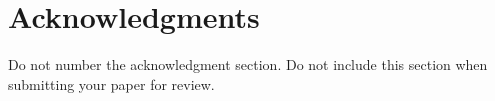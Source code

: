 \documentclass[11pt]{article}
\begin{document}
\begin{comment}
{\bf Citations}: Citations within the text appear
in parentheses as~\cite{Gusfield:97} or, if the author's name appears in
the text itself, as Gusfield~\shortcite{Gusfield:97}. 
Append lowercase letters to the year in cases of ambiguity.  
Treat double authors as in~\cite{Aho:72}, but write as in~\cite{Chandra:81} when more than two authors are involved. Collapse multiple citations as in~\cite{Gusfield:97,Aho:72}. Also refrain from using full citations as sentence constituents. We suggest that instead of
\begin{quote}
  ``\cite{Gusfield:97} showed that ...''
\end{quote}
you use
\begin{quote}
``Gusfield \shortcite{Gusfield:97}   showed that ...''
\end{quote}

If you are using the provided \LaTeX{} and Bib\TeX{} style files, you
can use the command \verb|\newcite| to get ``author (year)'' citations.



\subsection{Graphics}

{\bf Illustrations}: Place figures, tables, and photographs in the
paper near where they are first discussed, rather than at the end, if
possible.  Wide illustrations may run across both columns.  Color
illustrations are discouraged, unless you have verified that  
they will be understandable when printed in black ink.

{\bf Captions}: Provide a caption for every illustration; number each one
sequentially in the form:  ``Figure 1. Caption of the Figure.'' ``Table 1.
Caption of the Table.''  Type the captions of the figures and 
tables below the body, using 11 point text.  
\end{comment}










\section*{Acknowledgments}

Do not number the acknowledgment section. Do not include this section
when submitting your paper for review.\cite{goldberg}


%

\end{document}
